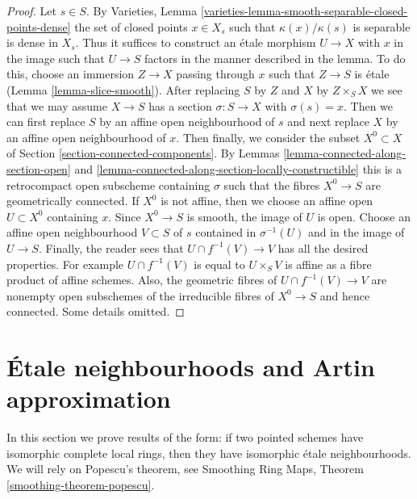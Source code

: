 \begin{proof}
Let $s \in S$. By
Varieties, Lemma \ref{varieties-lemma-smooth-separable-closed-points-dense}
the set of closed points $x \in X_s$ such that $\kappa(x)/\kappa(s)$
is separable is dense in $X_s$. Thus it suffices to construct an
\'etale morphism $U \to X$ with $x$ in the image
such that $U \to S$ factors in the manner described in the lemma.
To do this, choose an immersion $Z \to X$ passing through $x$
such that $Z \to S$ is \'etale (Lemma \ref{lemma-slice-smooth}).
After replacing $S$ by $Z$ and $X$ by $Z \times_S X$
we see that we may assume $X \to S$ has a section $\sigma : S \to X$
with $\sigma(s) = x$. Then we can first replace $S$ by an affine
open neighbourhood of $s$ and next replace $X$ by an affine open
neighbourhood of $x$. Then finally, we consider the subset
$X^0 \subset X$ of Section \ref{section-connected-components}.
By Lemmas \ref{lemma-connected-along-section-open} and
\ref{lemma-connected-along-section-locally-constructible}
this is a retrocompact open subscheme containing $\sigma$
such that the fibres $X^0 \to S$ are geometrically connected.
If $X^0$ is not affine, then we choose an affine open $U \subset X^0$
containing $x$. Since $X^0 \to S$ is smooth, the image of $U$
is open. Choose an affine open neighbourhood $V \subset S$ of $s$
contained in $\sigma^{-1}(U)$ and in the image of $U \to S$.
Finally, the reader sees that $U \cap f^{-1}(V) \to V$
has all the desired properties. For example $U \cap f^{-1}(V)$
is equal to $U \times_S V$ is affine as a fibre product of affine
schemes. Also, the geometric fibres of $U \cap f^{-1}(V) \to V$ are
nonempty open subschemes of the irreducible fibres of $X^0 \to S$
and hence connected. Some details omitted.
\end{proof}











\section{\'Etale neighbourhoods and Artin approximation}
\label{section-etale-nbhds-artin}

\noindent
In this section we prove results of the form: if two
pointed schemes have isomorphic complete local rings, then
they have isomorphic \'etale neighbourhoods. We will rely
on Popescu's theorem, see
Smoothing Ring Maps, Theorem \ref{smoothing-theorem-popescu}.

